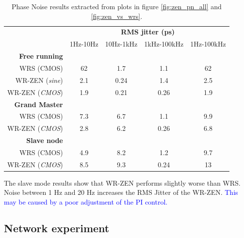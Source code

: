     
 \begin{table}\centering
     \begin{tabular}{@{} rcccc@{}}%
         & \multicolumn{4}{c}{\bfseries{RMS jitter (ps)}} \\
         \cmidrule(l){2-5}
         & 1Hz-10Hz & 10Hz-1kHz & 1kHz-100kHz  & 1Hz-100kHz \\ \midrule
         \textbf{Free running}\\
         \small{WRS (CMOS)}             & 62  & 1.7  & 1.1  & 62  \\
         \small{WR-ZEN (\textit{sine})} & 2.1 & 0.24 & 1.4  & 2.5 \\
         \small{WR-ZEN (\textit{CMOS})} & 1.9 & 0.21 & 0.26 & 1.9 \\
         \cmidrule(l){2-5}
         
         \textbf{Grand Master}\\
         \small{WRS (CMOS)}             & 7.3 & 6.7 & 1.1 & 9.9\\
         \small{WR-ZEN (\textit{CMOS})} & 2.8 & 6.2 & 0.26 & 6.8\\
         \cmidrule(l){2-5}
         
         \textbf{Slave node}\\
         \small{WRS (CMOS)}             & 4.9 & 8.2 & 1.2  & 9.7\\
         \small{WR-ZEN (\textit{CMOS})} & 8.5 & 9.3 & 0.24 & 13\\
         
         \bottomrule
        \end{tabular}
        \caption{Phase Noise results extracted from plots in figure \ref{fig:zen_pn_all} and \ref{fig:zen_vs_wrs}.}
        \label{tab:pn_results}
\end{table}

The slave mode results show that WR-ZEN performs slightly worse than WRS. Noise between 1 Hz and 20 Hz increases the RMS Jitter of the WR-ZEN. \textcolor{blue}{This may be caused by a poor adjustment of the PI control.}


\subsection{Network experiment} %
\label{subsec: net_exp}


